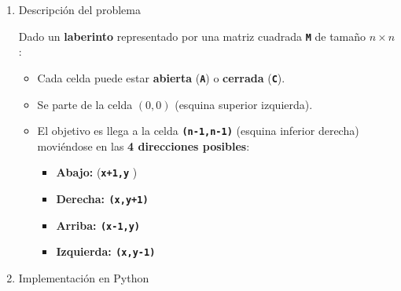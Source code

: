 \begin{enumerate}[label=\color{red}\textbf{\arabic*)}]
\begin{enumerate}[label=\arabic*)]
  \item Descripción del problema

    Dado un \textbf{laberinto} representado por una matriz cuadrada \textbf{\texttt{M}} de tamaño $n\times n$:
    \begin{itemize}[label=\textbullet]
      \item Cada celda puede estar \textbf{abierta} (\textbf{\texttt{A}}) o \textbf{cerrada} (\textbf{\texttt{C}}).
      \item Se parte de la celda $(0,0)$ (esquina superior izquierda).
      \item El objetivo es llega a la celda  \textbf{\texttt{(n-1,n-1)}} (esquina inferior derecha) moviéndose en las \textbf{4 direcciones posibles}:
        \begin{itemize}[label=\textbullet]
          \item \textbf{Abajo:} (\textbf{\texttt{x+1,y}} ) 
          \item \textbf{Derecha: \texttt{(x,y+1)}} 
          \item \textbf{Arriba: \texttt{(x-1,y)}} 
          \item \textbf{Izquierda: \texttt{(x,y-1)}} 
        \end{itemize}
    \end{itemize}
  \item Implementación en Python


\end{enumerate}
\end{enumerate}
